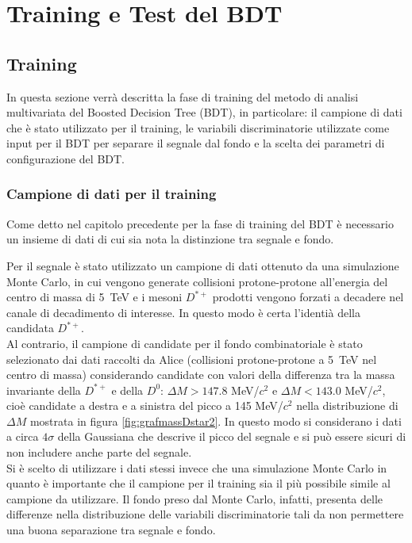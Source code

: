 \chapter{Training e Test del BDT}



\section{Training}

In questa sezione verr\`a descritta la fase di training del metodo di analisi multivariata del Boosted Decision Tree (BDT), in particolare: il campione di dati che \`e stato utilizzato per il training, le variabili discriminatorie utilizzate come input per il BDT per separare il segnale dal fondo e la scelta dei parametri di configurazione del BDT. 

\subsection{Campione di dati per il training}
Come detto nel capitolo precedente per la fase di training del BDT è necessario un insieme di dati di cui sia nota la distinzione tra segnale e fondo. 

Per il segnale è stato utilizzato un campione di dati ottenuto da una simulazione Monte Carlo,  in cui vengono generate collisioni protone-protone all'energia del centro di massa di 5~TeV e i mesoni $D^{*+}$ prodotti vengono forzati a decadere nel canale di decadimento di interesse. In questo modo \`e certa l'identi\`a della candidata $D^{*+}$.
\\Al contrario, il campione di candidate per il fondo combinatoriale \`e stato selezionato dai dati raccolti da Alice\cite{dati_ALICE} (collisioni protone-protone a 5~TeV nel centro di massa) considerando candidate con valori della differenza tra la massa invariante della $D^{*+}$ e della $D^0$: $\Delta M > 147.8$ MeV/$c^2$  e $\Delta M < 143.0$ MeV/$c^2$, cio\`e candidate a destra e a sinistra del picco a 145 MeV/$c^2$ nella distribuzione di $\Delta M$ mostrata in figura \ref{fig:grafmassDstar2}. In questo modo si considerano i dati a circa $4 \sigma$ della Gaussiana che descrive il picco del segnale e si pu\`o essere sicuri di non includere anche parte del segnale.
\\Si \`e scelto di utilizzare i dati stessi invece che una simulazione Monte Carlo in quanto \`e importante che il campione per il training sia il pi\`u possibile simile al campione da utilizzare. Il fondo preso dal Monte Carlo, infatti, presenta delle differenze nella distribuzione delle variabili discriminatorie tali da non permettere una buona separazione tra segnale e fondo.

